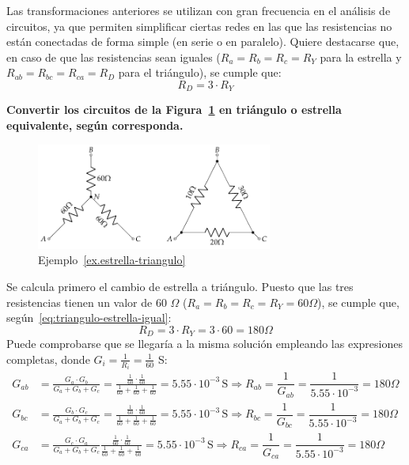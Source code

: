 	Las transformaciones anteriores se utilizan con gran
        frecuencia en el análisis de circuitos, ya que permiten
        simplificar ciertas redes en las que las resistencias no están
        conectadas de forma simple (en serie o en paralelo). Quiere
        destacarse que, en caso de que las resistencias sean iguales
        ($R_a=R_b=R_c=R_Y$ para la estrella y
        $R_{ab}=R_{bc}=R_{ca}=R_D$ para el triángulo), se cumple que:
	\begin{equation}\label{eq:triangulo-estrella-igual}
          \boxed{R_D=3\cdot R_Y}
	\end{equation}
	
	\begin{example}\label{ex.estrella-triangulo}
          \textbf{Convertir los circuitos de la
            Figura~\ref{fig:ejercicio7-bt1} en triángulo o estrella
            equivalente, según corresponda. }
          \begin{figure}[H]
            \centering
            \includegraphics[height=3.5cm]{../figs/ej7_BT1.pdf}
            \caption{Ejemplo~\ref{ex.estrella-triangulo}}
            \label{fig:ejercicio7-bt1}
          \end{figure}
 	
          Se calcula primero el cambio de estrella a triángulo. Puesto
          que las tres resistencias tienen un valor de 60 $\Omega$
          ($R_a=R_b=R_c=R_Y=60\Omega$), se cumple que,
          según~\eqref{eq:triangulo-estrella-igual}:
          \begin{equation*}
            R_D=3\cdot R_Y=3\cdot 60=180\Omega
          \end{equation*}
          Puede comprobarse que se llegaría a la misma solución
          empleando las expresiones completas, donde
          $G_i=\frac{1}{R_i}=\frac{1}{60}$ S:
          \begin{align*}
            G_{ab} &= \frac{G_a \cdot G_b}{G_a + G_b + G_c}=\frac{\frac{1}{60} \cdot \frac{1}{60}}{\frac{1}{60} + \frac{1}{60} + \frac{1}{60}}=5.55\cdot 10^{-3}\,\si{\siemens}\Rightarrow R_{ab}=\dfrac{1}{G_{ab}}=\dfrac{1}{5.55\cdot 10^{-3}}=180\Omega\\[10pt]
            G_{bc} &= \frac{G_b \cdot G_c}{G_a + G_b + G_c}=\frac{\frac{1}{60} \cdot \frac{1}{60}}{\frac{1}{60} + \frac{1}{60} + \frac{1}{60}}=5.55\cdot 10^{-3}\,\si{\siemens}\Rightarrow R_{bc}=\dfrac{1}{G_{bc}}=\dfrac{1}{5.55\cdot 10^{-3}}=180\Omega\\[10pt]
            G_{ca} &= \frac{G_c \cdot G_a}{G_a + G_b + G_c}\frac{\frac{1}{60} \cdot \frac{1}{60}}{\frac{1}{60} + \frac{1}{60} + \frac{1}{60}}=5.55\cdot 10^{-3}\,\si{\siemens}\Rightarrow R_{ca}=\dfrac{1}{G_{ca}}=\dfrac{1}{5.55\cdot 10^{-3}}=180\Omega
          \end{align*}


\end{example}
